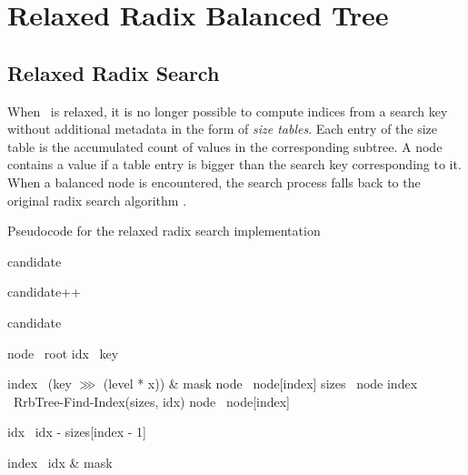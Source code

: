 \chapter{Relaxed Radix Balanced Tree}

\section{Relaxed Radix Search}

When \rbtree\ is relaxed, it is no longer possible to compute indices from a search key without additional metadata in the form of \emph{size tables}. Each entry of the size table is the accumulated count of values in the corresponding subtree. A node contains a value if a table entry is bigger than the search key corresponding to it. When a balanced node is encountered, the search process falls back to the original radix search algorithm . 

\begin{listing}[ht!]        
    \caption{Pseudocode for the relaxed radix search implementation}
    \label{lst:rrb-tree-relaxed-radix-search}        

    \begin{algorithmic}        
            \State candidate 

                \State candidate++
            \EndIf

            \State \Return candidate
        \EndFunction

        \State

            \State node \la\ root
            \State idx \la\ key
            
                    \State index \la\ (key $\ggg$ (level * x)) \& mask
                    \State node \la\ node[index]
                \Else
                    \State sizes \la\ node
                    \State index \la\ RrbTree-Find-Index(sizes, idx)
                    \State node \la\ node[index]

                        \State idx \la\ idx - sizes[index - 1]
                    \EndIf                    
                \EndIf            
            \EndFor

            \State index \la\ idx \& mask
            \State {}
        \EndFunction
    \end{algorithmic}
\end{listing}

